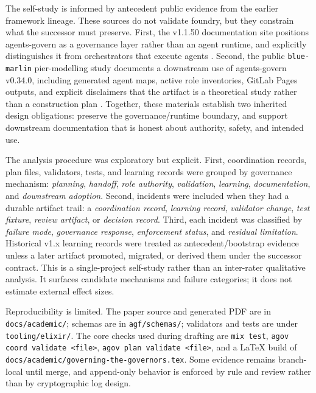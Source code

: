 \documentclass[conference]{IEEEtran}
\begin{document}
The self-study is informed by antecedent public evidence from the earlier framework lineage. These sources do not validate foundry, but they constrain what the successor must preserve. First, the v1.1.50 documentation site positions agents-govern as a governance layer rather than an agent runtime, and explicitly distinguishes it from orchestrators that execute agents \cite{agentsgovern2026position}. Second, the public \texttt{blue-marlin} pier-modelling study documents a downstream use of agents-govern v0.34.0, including generated agent maps, active role inventories, GitLab Pages outputs, and explicit disclaimers that the artifact is a theoretical study rather than a construction plan \cite{bluemarlin2026governance}. Together, these materials establish two inherited design obligations: preserve the governance/runtime boundary, and support downstream documentation that is honest about authority, safety, and intended use.

The analysis procedure was exploratory but explicit. First, coordination records, plan files, validators, tests, and learning records were grouped by governance mechanism: \emph{planning}, \emph{handoff}, \emph{role authority}, \emph{validation}, \emph{learning}, \emph{documentation}, and \emph{downstream adoption}. Second, incidents were included when they had a durable artifact trail: a \emph{coordination record}, \emph{learning record}, \emph{validator change}, \emph{test fixture}, \emph{review artifact}, or \emph{decision record}. Third, each incident was classified by \emph{failure mode}, \emph{governance response}, \emph{enforcement status}, and \emph{residual limitation}. Historical v1.x learning records were treated as antecedent/bootstrap evidence unless a later artifact promoted, migrated, or derived them under the successor contract. This is a single-project self-study rather than an inter-rater qualitative analysis. It surfaces candidate mechanisms and failure categories; it does not estimate external effect sizes.

Reproducibility is limited. The paper source and generated PDF are in \texttt{docs/academic/}; schemas are in \texttt{agf/schemas/}; validators and tests are under \texttt{tooling/elixir/}. The core checks used during drafting are \texttt{mix test}, \texttt{agov coord validate <file>}, \texttt{agov plan validate <file>}, and a LaTeX build of \texttt{docs/academic/governing-the-governors.tex}. Some evidence remains branch-local until merge, and append-only behavior is enforced by rule and review rather than by cryptographic log design.
\end{document}
